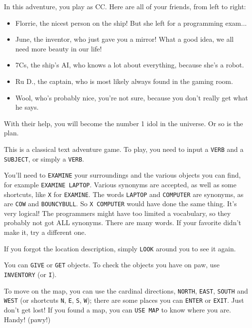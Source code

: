 \documentclass{article}
\newcommand{\bckg}[1]{\AddToShipoutPictureBG*{\texttt{[image: \#1]}}}
\begin{document}
In this adventure, you play as CC.
Here are all of your friends, from left to right:
\begin{itemize}
    \item Florrie, the nicest person on the ship! But she left for a programming exam...
    \item June, the inventor, who just gave you a mirror! What a good idea, we all need more beauty in our life!
    \item 7Cs, the ship's AI, who knows a lot about everything, because she's a robot.
    \item Ru D., the captain, who is most likely always found in the gaming room.
    \item Wool, who's probably nice, you're not sure, because you don't really get what he says.
\end{itemize}

With their help, you will become the number 1 idol in the universe. Or so is the plan.

\clearpage
{}
\bckg{img/bg}

This is a classical text adventure game.
To play, you need to input a \texttt{VERB} and a \texttt{SUBJECT}, or simply a \texttt{VERB}.

You'll need to \texttt{EXAMINE} your surroundings and the various objects you can find,
for example \texttt{EXAMINE LAPTOP}.
Various synonyms are accepted, as well as some shortcuts, like \texttt{X} for \texttt{EXAMINE}.
The words \texttt{LAPTOP} and \texttt{COMPUTER} are synonyms, as are \texttt{COW} and \texttt{BOUNCYBULL}.
So \texttt{X COMPUTER} would have done the same thing.
It's very logical!
The programmers might have too limited a vocabulary, so they probably not got ALL synonyms.
There are many words. If your favorite didn't make it, try a different one.

If you forgot the location description, simply \texttt{LOOK} around you to see it again.

You can \texttt{GIVE} or \texttt{GET} objects. To check the objects you have on paw,
use \texttt{INVENTORY} (or \texttt{I}).

To move on the map, you can use the cardinal directions, \texttt{NORTH}, \texttt{EAST},
\texttt{SOUTH} and \texttt{WEST} (or shortcuts \texttt{N}, \texttt{E}, \texttt{S}, \texttt{W});
there are some places you can \texttt{ENTER} or \texttt{EXIT}.
Just don't get lost! If you found a map, you can \texttt{USE MAP} to know where you are.
Handy! (pawy!)
\end{document}
